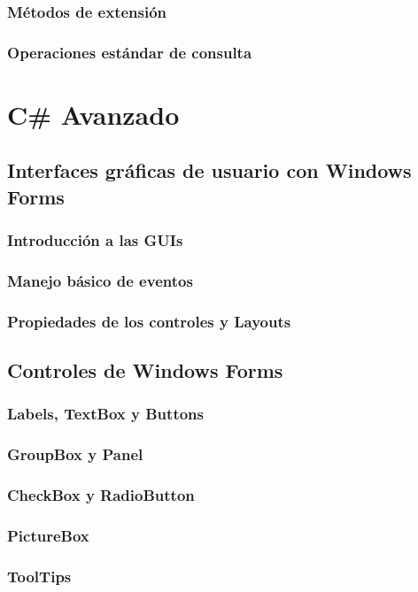 \documentclass[12pt,a4paper]{report}
\begin{document}
\section{Métodos de extensión}
\section{Operaciones estándar de consulta}

\part{C\# Avanzado}
\chapter{ Interfaces gráficas de usuario con Windows Forms}
\section{Introducción a las GUIs}
\section{Manejo básico de eventos}
\section{Propiedades de los controles y Layouts}

\chapter{Controles de Windows Forms}
\section{Labels, TextBox y Buttons}
\section{GroupBox y Panel}
\section{CheckBox y RadioButton}
\section{PictureBox}
\section{ToolTips}
\end{document}
